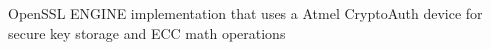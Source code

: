 Open\+S\+S\+L E\+N\+G\+I\+N\+E implementation that uses a Atmel Crypto\+Auth device for secure key storage and E\+C\+C math operations 